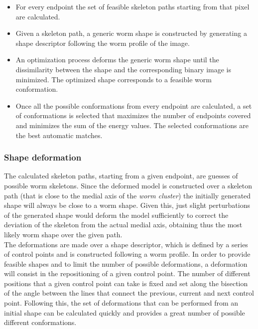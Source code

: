 \begin{itemize}
\item For every endpoint the set of feasible skeleton paths starting from that pixel
  are calculated.
\item Given a skeleton path, a generic worm shape is constructed by generating a shape
descriptor following the worm profile of the image.
\item An optimization process deforms the generic worm shape until the dissimilarity
between the shape and the corresponding binary image is minimized. The optimized
shape corresponds to a feasible worm conformation.
\item Once all the possible conformations from every endpoint are calculated, a set of
conformations is selected that maximizes the number of endpoints covered and minimizes
the sum of the energy values. The selected conformations are the best automatic matches.
\end{itemize}

\subsubsection*{Shape deformation}

The calculated skeleton paths, starting from a given endpoint, are guesses of possible
worm skeletons. Since the deformed model is constructed over a skeleton path 
(that is close to the medial axis of the \emph{worm cluster}) the initially generated 
shape will always be close to a worm shape. Given this, just slight perturbations of
the generated shape would deform the model sufficiently to correct the deviation of the
skeleton from the actual medial axis, obtaining thus the most likely worm shape
over the given path.\\

The deformations are made over a shape descriptor, which is defined by a series of 
control points and is constructed following a worm profile. In order to provide feasible
shapes and to limit the number of possible deformations, a deformation will consist
in the repositioning of a given control point. The number of different positions that a 
given control point can take is fixed and set along the bisection of the angle between
the lines that connect the previous, current and next control point. 
Following this, the set of deformations that can be performed from an initial shape 
can be calculated quickly and provides a great number of possible different conformations.\\

